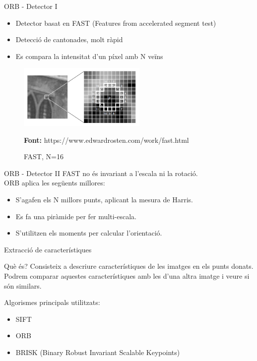 \documentclass[xcolor=table, 11pt]{beamer}
\newcommand*{\captionsource}[2]{%
  \caption[{#1}]{#1}\par
  \vspace{-0.4cm}
  \tiny{\textbf{Font:} #2\par}}
\newcommand\tz{\fontsize{13}{15.6}\selectfont}
\begin{document}
	\begin{frame}{ORB - Detector I}
		\tz
		\begin{itemize}
			\item{Detector basat en FAST\cite{Rosten:2006:MLH:2094437.2094478} (Features from accelerated segment test)}
			\item{Detecció de cantonades, molt ràpid}
			\item{Es compara la intensitat d'un píxel amb N veïns}
		\end{itemize}
		\begin{figure}[H]
			\centering
			\includegraphics[width=0.55\textwidth]{images/fast}
			\captionsource{FAST, N=16}{https://www.edwardrosten.com/work/fast.html}
		\end{figure}
	\end{frame}

	\begin{frame}{ORB - Detector II}
		\tz
		\alert{FAST no és invariant a l'escala ni la rotació.}\\
		\vspace{0.5cm}
		ORB aplica les següents millores:\\

		\begin{itemize}
			\item{S'agafen els N millors punts, aplicant la mesura de Harris.}
			\item{Es fa una piràmide per fer multi-escala.}
			\item{S'utilitzen els moments per calcular l'orientació.}
		\end{itemize}
	\end{frame}

	\begin{frame}{Extracció de característiques}
		\tz
		\begin{block}{Què és?}
			Consisteix a descriure característiques de les imatges en els punts donats. Podrem comparar aquestes característiques amb les d'una altra imatge i veure si són similars.
		\end{block}
		Algorismes principals utilitzats:
		\begin{itemize}
			\item SIFT
			\item ORB
			\item BRISK\cite{Leutenegger:2011:BBR:2355573.2356277} (Binary Robust Invariant Scalable Keypoints)
		\end{itemize}
	\end{frame}
\end{document}
